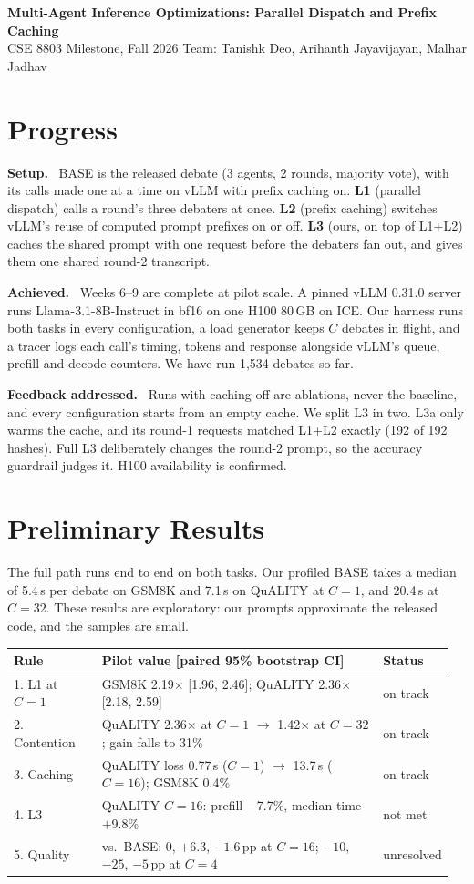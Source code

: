 \documentclass[11pt,letterpaper]{article}
\newcommand{\head}[1]{\textbf{#1}\ }
\newcommand{\projtitle}{Multi-Agent Inference Optimizations: Parallel Dispatch and Prefix Caching}
\begin{document}
\begin{center}
{\large\bfseries \projtitle}\\[3pt]
CSE 8803 Milestone, Fall 2026 \quad Team: Tanishk Deo, Arihanth Jayavijayan, Malhar Jadhav
\end{center}

\section{Progress}
\head{Setup.} BASE is the released debate (3 agents, 2 rounds, majority vote), with its calls made one at a time on vLLM with prefix caching on. \textbf{L1} (parallel dispatch) calls a round's three debaters at once. \textbf{L2} (prefix caching) switches vLLM's reuse of computed prompt prefixes on or off. \textbf{L3} (ours, on top of L1+L2) caches the shared prompt with one request before the debaters fan out, and gives them one shared round-2 transcript.

\head{Achieved.} Weeks 6--9 are complete at pilot scale. A pinned vLLM 0.31.0 server runs Llama-3.1-8B-Instruct in bf16 on one H100 80\,GB on ICE. Our harness runs both tasks in every configuration, a load generator keeps $C$ debates in flight, and a tracer logs each call's timing, tokens and response alongside vLLM's queue, prefill and decode counters. We have run 1,534 debates so far.

\head{Feedback addressed.} Runs with caching off are ablations, never the baseline, and every configuration starts from an empty cache. We split L3 in two. L3a only warms the cache, and its round-1 requests matched L1+L2 exactly (192 of 192 hashes). Full L3 deliberately changes the round-2 prompt, so the accuracy guardrail judges it. H100 availability is confirmed.

\section{Preliminary Results}
The full path runs end to end on both tasks. Our profiled BASE takes a median of 5.4\,s per debate on GSM8K and 7.1\,s on QuALITY at $C{=}1$, and 20.4\,s at $C{=}32$. These results are exploratory: our prompts approximate the released code, and the samples are small.

\smallskip
{\small
\begin{tabular}{@{}p{0.2\linewidth}p{0.64\linewidth}p{0.12\linewidth}@{}}
\toprule
Rule & Pilot value [paired 95\% bootstrap CI] & Status \\
\midrule
1. L1 at $C{=}1$ & GSM8K 2.19$\times$ [1.96, 2.46]; QuALITY 2.36$\times$ [2.18, 2.59] & on track \\
2. Contention & QuALITY 2.36$\times$ at $C{=}1$ $\to$ 1.42$\times$ at $C{=}32$; gain falls to 31\% & on track \\
3. Caching & QuALITY loss 0.77\,s ($C{=}1$) $\to$ 13.7\,s ($C{=}16$); GSM8K 0.4\% & on track \\
4. L3 & QuALITY $C{=}16$: prefill $-$7.7\%, median time $+$9.8\% & not met \\
5. Quality & vs.\ BASE: $0$, $+6.3$, $-1.6$\,pp at $C{=}16$; $-10$, $-25$, $-5$\,pp at $C{=}4$ & unresolved \\
\bottomrule
\end{tabular}}
\end{document}
